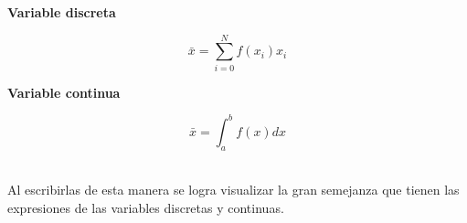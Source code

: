 \begin{minipage}{0.5\linewidth}
    \begin{center}
        \textbf{Variable discreta}
    \end{center}
    \begin{equation*}
        \bar{x}=\sum_{i=0}^N f(x_i)x_i
    \end{equation*}
\end{minipage}
\begin{minipage}{0.5\linewidth}
    \begin{center}
        \textbf{Variable continua}
    \end{center}
    \begin{equation*}
        \bar{x}=\int_a^b f(x)dx
    \end{equation*}
\end{minipage}\\

Al escribirlas de esta manera se logra visualizar la gran semejanza que tienen las expresiones de las variables discretas y continuas.

